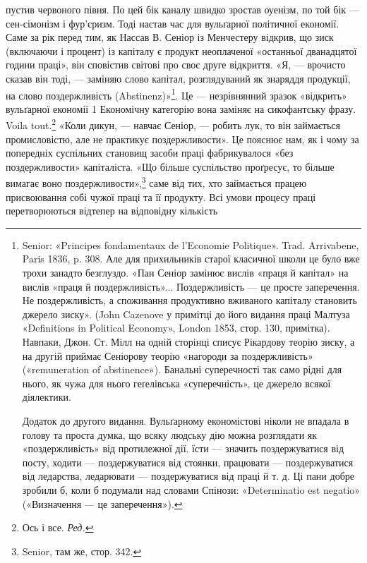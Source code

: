 \parcont{}  %
пустив червоного півня. По цей бік каналу швидко зростав оуенізм,
по той бік — сен-сімонізм і фур'єризм. Тоді настав час
для вульґарної політичної економії. Саме за рік перед тим, як
Нассав В. Сеніор із Менчестеру відкрив, що зиск (включаючи
і процент) із капіталу є продукт неоплаченої «останньої дванадцятої
години праці», він сповістив світові про своє друге відкриття.
«Я, — врочисто сказав він тоді, — заміняю слово капітал,
розглядуваний як знаряддя продукції, на слово поздержливість
(Abstinenz)»\footnote{
Senior: «Principes fondamentaux de l’Economie Politique». Trad.
Arrivabene, Paris 1836, p. 308. Але для прихильників старої класичної
школи це було вже трохи занадто безглуздо. «Пан Сеніор замінює вислів
«праця й капітал» на вислів «праця й поздержливість»... Поздержливість
— це просте заперечення. Не поздержливість, а споживання продуктивно
вживаного капіталу становить джерело зиску». (John Cazenove
у примітці до його видання праці Малтуза «Definitions in Political
Economy», London 1853, стор. 130, примітка). Навпаки, Джон. Ст.
Мілл на одній сторінці списує Рікардову теорію зиску, а на другій приймає
Сеніорову теорію «нагороди за поздержливість» («remuneration
of abstinence»). Банальні суперечності так само рідні для нього, як чужа
для нього геґелівська «суперечність», це джерело всякої діялектики.

Додаток до другого видання. Вульґарному економістові ніколи не
впадала в голову та проста думка, що всяку людську дію можна розглядати
як «поздержливість» від протилежної дії. їсти — значить поздержуватися
від посту, ходити — поздержуватися від стоянки, працювати —
поздержуватися від ледарства, ледарювати — поздержуватися від праці
й т. д. Ці пани добре зробили б, коли б подумали над словами Спінози:
«Determinatio est negatio» («Визначення — це заперечення»).
}. Це — незрівнянний зразок «відкрить» вульґарної
економії 1 Економічну категорію вона заміняє на сикофантську
фразу. Voila tout.\footnote*{
Ось і все. \emph{Ред.}
} «Коли дикун, — навчає Сеніор, — робить
лук, то він займається промисловістю, але не практикує
поздержливости». Це пояснює нам, як і чому за попередніх суспільних
становищ засоби праці фабрикувалося «без поздержливости»
капіталіста. «Що більше суспільство проґресує, то більше
вимагає воно поздержливости»,\footnote{
Senior, там же, стор. 342.
} саме від тих, хто займається
працею присвоювання собі чужої праці та її продукту. Всі умови
процесу праці перетворюються відтепер на відповідну кількість
